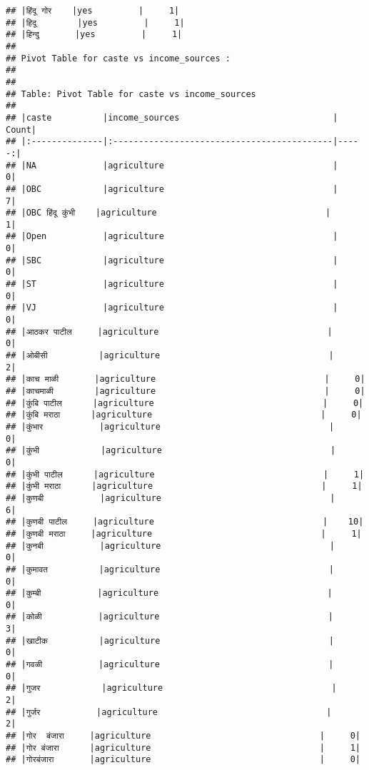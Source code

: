 \documentclass[
]{article}
\begin{document}
\begin{verbatim}
## |हिंदू गोर    |yes         |     1|
## |हिदू        |yes         |     1|
## |हिन्दु       |yes         |     1|
## 
## Pivot Table for caste vs income_sources :
## 
## 
## Table: Pivot Table for caste vs income_sources
## 
## |caste          |income_sources                              | Count|
## |:--------------|:-------------------------------------------|-----:|
## |NA             |agriculture                                 |     0|
## |OBC            |agriculture                                 |     7|
## |OBC हिंदू कुंभी    |agriculture                                 |     1|
## |Open           |agriculture                                 |     0|
## |SBC            |agriculture                                 |     0|
## |ST             |agriculture                                 |     0|
## |VJ             |agriculture                                 |     0|
## |आठकर पाटील     |agriculture                                 |     0|
## |ओबीसी          |agriculture                                 |     2|
## |काच माळी       |agriculture                                 |     0|
## |काचमाळी        |agriculture                                 |     0|
## |कुंबि पाटील      |agriculture                                 |     0|
## |कुंबि मराठा      |agriculture                                 |     0|
## |कुंभार           |agriculture                                 |     0|
## |कुंभी            |agriculture                                 |     0|
## |कुंभी पाटील      |agriculture                                 |     1|
## |कुंभी मराठा      |agriculture                                 |     1|
## |कुणबी           |agriculture                                 |     6|
## |कुणबी पाटील     |agriculture                                 |    10|
## |कुणबी मराठा     |agriculture                                 |     1|
## |कुनबी           |agriculture                                 |     0|
## |कुमावत          |agriculture                                 |     0|
## |कुम्बी           |agriculture                                 |     0|
## |कोळी           |agriculture                                 |     3|
## |खाटीक          |agriculture                                 |     0|
## |गवळी           |agriculture                                 |     0|
## |गुजर            |agriculture                                 |     2|
## |गुर्जर           |agriculture                                 |     2|
## |गोर  बंजारा     |agriculture                                 |     0|
## |गोर बंजारा      |agriculture                                 |     1|
## |गोरबंजारा       |agriculture                                 |     0|

\end{verbatim}
\end{document}
